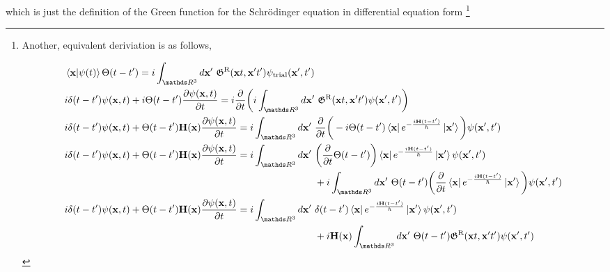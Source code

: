 \documentclass{homework}
\begin{document}
which is just the definition of the Green function for the Schr\"odinger equation in differential equation form
\iffalse\footnote{Another, equivalent deriviation is as follows,

\begin{equation}
    \begin{split}
        &\bra{{\bf x}} \ket{\psi(t)} \Theta(t-t') = i \int_{\R^3} d{\bf x}' \blanky \mathfrak{G}^{\textnormal{R}}({\bf x}t, {\bf x}'t') \psi_{\textnormal{trial}}({\bf x}', t') \\
        &i \delta(t-t') \psi({\bf x}, t) + i \Theta(t-t') \frac{\partial \psi({\bf x}, t)}{\partial t} = i \frac{\partial}{\partial t} \bigg(i \int_{\R^3} d{\bf x}' \blanky \mathfrak{G}^{\textnormal{R}}({\bf x}t, {\bf x}'t') \psi({\bf x}', t') \bigg) \\
        & i \delta(t-t') \psi({\bf x}, t) + \Theta(t-t') {\bf H}({\bf x}) \frac{\partial \psi({\bf x}, t)}{\partial t} = i \int_{\R^3} d{\bf x}' \blanky \frac{\partial}{\partial t} \bigg( - i \Theta(t-t') \bra{{\bf x}} e^{-\frac{i {\bf H} (t-t')}{\hbar}} \ket{{\bf x}'}\bigg) \psi({\bf x}', t') \\
        &  i \delta(t-t') \psi({\bf x}, t) + \Theta(t-t') {\bf H}({\bf x}) \frac{\partial \psi({\bf x}, t)}{\partial t} = i \int_{\R^3} d{\bf x}' \blanky \bigg(\frac{\partial}{\partial t} \Theta(t-t')\bigg) \bra{{\bf x}} e^{-\frac{i {\bf H} (t-t')}{\hbar}} \ket{{\bf x}'} \psi({\bf x}', t') \\
        & \blanky\blanky\blanky\blanky\blanky\blanky\blanky\blanky\blanky\blanky\blanky\blanky\blanky\blanky\blanky\blanky\blanky\blanky\blanky\blanky\blanky\blanky\blanky\blanky\blanky\blanky\blanky\blanky\blanky\blanky\blanky\blanky \blanky\blanky\blanky\blanky\blanky\blanky\blanky\blanky\blanky\blanky\blanky\blanky\blanky\blanky\blanky\blanky\blanky\blanky\blanky\blanky\blanky\blanky\blanky\blanky\blanky\blanky\blanky\blanky\blanky\blanky\blanky\blanky\blanky\blanky\blanky\blanky\blanky\blanky\blanky\blanky\blanky\blanky\blanky\blanky\blanky + i \int_{\R^3} d{\bf x}' \blanky \Theta(t-t') \bigg(\frac{\partial}{\partial t} \bra{{\bf x}} e^{-\frac{i {\bf H} (t-t')}{\hbar}} \ket{{\bf x}'} \bigg) \psi({\bf x}', t')\\
        &  i \delta(t-t') \psi({\bf x}, t) + \Theta(t-t') {\bf H}({\bf x}) \frac{\partial \psi({\bf x}, t)}{\partial t} = i \int_{\R^3} d{\bf x}' \blanky \delta(t-t') \bra{{\bf x}} e^{-\frac{i {\bf H} (t-t')}{\hbar}} \ket{{\bf x}'} \psi({\bf x}', t') \\
        & \blanky\blanky\blanky\blanky\blanky\blanky\blanky\blanky\blanky\blanky\blanky\blanky\blanky\blanky\blanky\blanky\blanky\blanky\blanky\blanky\blanky\blanky\blanky\blanky\blanky\blanky\blanky\blanky\blanky\blanky\blanky\blanky \blanky\blanky\blanky\blanky\blanky\blanky\blanky\blanky\blanky\blanky\blanky\blanky\blanky\blanky\blanky\blanky\blanky\blanky\blanky\blanky\blanky\blanky\blanky\blanky\blanky\blanky\blanky\blanky\blanky\blanky\blanky\blanky\blanky\blanky\blanky\blanky\blanky\blanky\blanky\blanky\blanky\blanky\blanky\blanky\blanky + i {\bf H}({\bf x}) \int_{\R^3} d{\bf x}' \blanky \Theta(t-t') \mathfrak{G}^{\textnormal{R}}({\bf x}t, {\bf x}'t') \psi({\bf x}', t')\\

\end{split}
\end{equation}}
\end{document}
